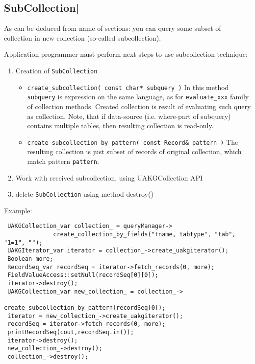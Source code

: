 \subsection{ SubCollection|}

 As can be deduced from name of sections:  you can query some subset of collection in new collection (so-called subcollection).

Application programmer must perform next steps to use subcollection technique:

\begin{enumerate}
  \item Creation of \verb|SubCollection|
     \begin{itemize}
       \item \verb|create_subcollection( const char* subquery )| 
       In this method \verb|subquery| is expression on the same language, as
       for \verb|evaluate_xxx| family of collection methods. Created collection
       is result of evaluating such query as collection. Note, that if 
        data-source (i.e. where-part of subquery) contains multiple tables,
        then resulting collection is read-only.
       \item \verb|create_subcollection_by_pattern( const Record& pattern )|
       The resulting collection is just subset of records of original collection, which match pattern \verb|pattern|.
     \end{itemize}
  \item Work with received subcollection, using UAKGCollection API
  \item delete \verb|SubCollection| using method destroy()
 \end{enumerate}

Example:

\begin{verbatim}
 UAKGCollection_var collection_ = queryManager->
              create_collection_by_fields("tname, tabtype", "tab", "1=1", "");
 UAKGIterator_var iterator = collection_->create_uakgiterator();
 Boolean more;
 RecordSeq_var recordSeq = iterator->fetch_records(0, more);
 FieldValueAccess::setNull(recordSeq[0][0]);
 iterator->destroy();
 UAKGCollection_var new_collection_ = collection_->
                                create_subcollection_by_pattern(recordSeq[0]);
 iterator = new_collection_->create_uakgiterator();
 recordSeq = iterator->fetch_records(0, more);
 printRecordSeq(cout,recordSeq.in());
 iterator->destroy();
 new_collection_->destroy();
 collection_->destroy();
\end{verbatim}



